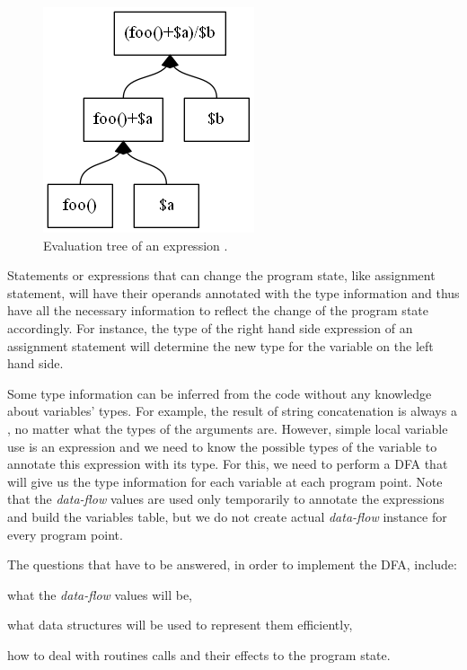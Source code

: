         \begin{figure}[h]  
          \centering        
          \includegraphics[scale=0.5]{graphs/evaltree.png}
          \caption{Evaluation tree of an expression .\label{evaltree}}    
        \end{figure}        
        
        Statements or expressions that can change the program state, 
        like assignment statement, will have their operands 
        annotated with the type information and thus have all 
        the necessary information to reflect the change of 
        the program state accordingly. For instance, 
        the type of the right hand side expression of an assignment 
        statement will determine the new type for the variable 
        on the left hand side.
        
        Some type information can be inferred from the code without 
        any knowledge about variables' types. For example, the result 
        of string concatenation is always a , no matter 
        what the types of the arguments are. However, simple local 
        variable use is an expression and we need to know the possible 
        types of the variable to annotate this expression 
        with its type. For this, we need to perform a DFA that will 
        give us the type information for each variable at each program 
        point. Note that the \emph{data-flow} values are used only 
        temporarily to annotate the expressions and build the variables 
        table, but we do not create actual \emph{data-flow} instance 
        for every program point.
        
        The questions that have to be answered, in order to 
        implement the DFA, include:
        
        \begin{itemize*}
            \item what the \emph{data-flow} values will be, 
            \item what data structures will be used to represent them efficiently, 
            \item how to deal with routines calls and their effects to the program state.
        \end{itemize*}
        
